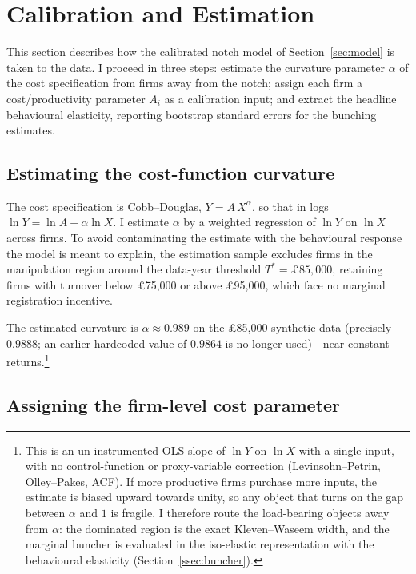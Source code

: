 \section{Calibration and Estimation}
\label{sec:calibration}

This section describes how the calibrated notch model of Section~\ref{sec:model}
is taken to the data. I proceed in three steps: estimate the curvature
parameter $\alpha$ of the cost specification from firms away from the notch;
assign each firm a cost/productivity parameter $A_i$ as a calibration input; and
extract the headline behavioural elasticity, reporting bootstrap standard errors
for the bunching estimates.

\subsection{Estimating the cost-function curvature}

The cost specification is Cobb--Douglas, $Y = A\,X^{\alpha}$, so that in logs
\(\ln Y = \ln A + \alpha \ln X\). I estimate $\alpha$ by a weighted regression
of $\ln Y$ on $\ln X$ across firms. To avoid contaminating the estimate with the
behavioural response the model is meant to explain, the estimation sample excludes
firms in the manipulation region around the data-year threshold
$T^{*}=\pounds85{,}000$, retaining firms with turnover below \pounds75{,}000 or
above \pounds95{,}000, which face no marginal registration incentive.

The estimated curvature is $\alpha \approx 0.989$ on the \pounds85{,}000 synthetic
data (precisely $0.9888$; an earlier hardcoded value of $0.9864$ is no longer
used)---near-constant returns.\footnote{This is an un-instrumented OLS slope of
$\ln Y$ on $\ln X$ with a single input, with no control-function or
proxy-variable correction (Levinsohn--Petrin, Olley--Pakes, ACF). If more
productive firms purchase more inputs, the estimate is biased upward towards
unity, so any object that turns on the gap between $\alpha$ and $1$ is fragile.
I therefore route the load-bearing objects away from $\alpha$: the dominated
region is the exact Kleven--Waseem width, and the marginal buncher is evaluated in
the iso-elastic representation with the behavioural elasticity
(Section~\ref{ssec:buncher}).}

\subsection{Assigning the firm-level cost parameter}

